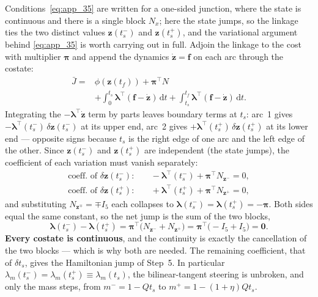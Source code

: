\documentclass[../main.tex]{subfiles}
\begin{document}
Conditions~\eqref{eq:app_35} are written for a one-sided junction, where the state is continuous and there is a single block $N_x$; here the state jumps, so the linkage ties the two distinct values $\mathbf{z}(t_s^-)$ and $\mathbf{z}(t_s^+)$, and the variational argument behind \eqref{eq:app_35} is worth carrying out in full. Adjoin the linkage to the cost with multiplier $\boldsymbol{\pi}$ and append the dynamics $\dot{\mathbf{z}} = \mathbf{f}$ on each arc through the costate:
\begin{equation}
\begin{aligned}
  \bar J = {}& \phi(\mathbf{z}(t_f)) + \boldsymbol{\pi}^{\!\top} N \\
  &+ \int_0^{t_s}\!\boldsymbol{\lambda}^{\!\top}(\mathbf{f}-\dot{\mathbf{z}})\,\mathrm{d}t
  + \int_{t_s}^{t_f}\!\boldsymbol{\lambda}^{\!\top}(\mathbf{f}-\dot{\mathbf{z}})\,\mathrm{d}t .
\end{aligned}
\end{equation}
Integrating the $-\boldsymbol{\lambda}^{\!\top}\dot{\mathbf{z}}$ term by parts leaves boundary terms at $t_s$: arc~1 gives $-\boldsymbol{\lambda}^{\!\top}(t_s^-)\,\delta\mathbf{z}(t_s^-)$ at its upper end, arc~2 gives $+\boldsymbol{\lambda}^{\!\top}(t_s^+)\,\delta\mathbf{z}(t_s^+)$ at its lower end --- opposite signs because $t_s$ is the right edge of one arc and the left edge of the other. Since $\mathbf{z}(t_s^-)$ and $\mathbf{z}(t_s^+)$ are independent (the state jumps), the coefficient of each variation must vanish separately:
\begin{equation}
\begin{aligned}
  \text{coeff. of }\delta\mathbf{z}(t_s^-):&\quad
  -\boldsymbol{\lambda}^{\!\top}(t_s^-) + \boldsymbol{\pi}^{\!\top} N_{\mathbf{z}^-} = 0, \\
  \text{coeff. of }\delta\mathbf{z}(t_s^+):&\quad
  +\boldsymbol{\lambda}^{\!\top}(t_s^+) + \boldsymbol{\pi}^{\!\top} N_{\mathbf{z}^+} = 0,
\end{aligned}
\end{equation}
and substituting $N_{\mathbf{z}^\mp} = \mp I_5$ each collapses to $\boldsymbol{\lambda}(t_s^-) = \boldsymbol{\lambda}(t_s^+) = -\boldsymbol{\pi}$. Both sides equal the same constant, so the net jump is the sum of the two blocks,
\begin{equation}
  \boldsymbol{\lambda}(t_s^-) - \boldsymbol{\lambda}(t_s^+)
  = \boldsymbol{\pi}^{\!\top}\bigl(N_{\mathbf{z}^-} + N_{\mathbf{z}^+}\bigr)
  = \boldsymbol{\pi}^{\!\top}\bigl(-I_5 + I_5\bigr) = \mathbf{0} .
\end{equation}
\textbf{Every costate is continuous}, and the continuity is exactly the cancellation of the two blocks --- which is why both are needed. The remaining coefficient, that of $\delta t_s$, gives the Hamiltonian jump of Step~5. In particular $\lambda_m(t_s^-) = \lambda_m(t_s^+) \equiv \lambda_m(t_s)$, the bilinear-tangent steering is unbroken, and only the mass steps, from $m^- = 1 - Q t_s$ to $m^+ = 1 - (1+\eta)Q t_s$.
\end{document}
